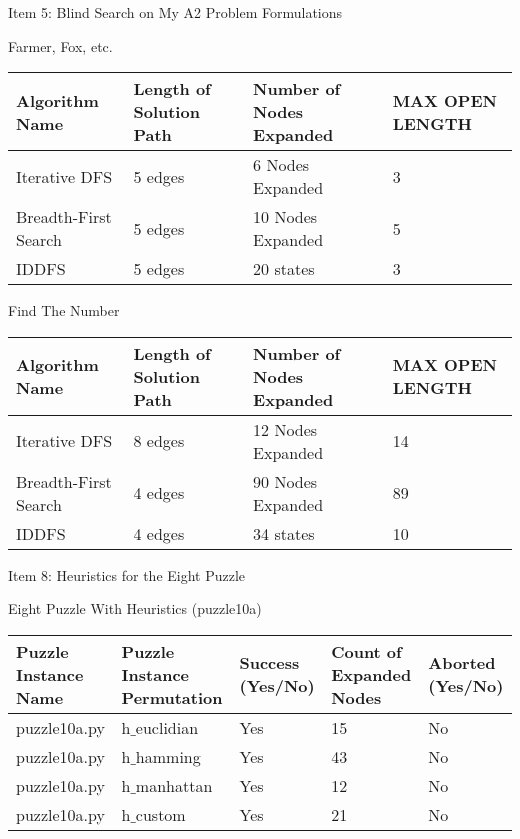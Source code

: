 \documentclass[12pt]{exam}
\begin{document}
\begin{questions}
\question Item 5: Blind Search on My A2 Problem Formulations


\begin{center}
    \tiny
    Farmer, Fox, etc.\\
    \begin{tabu} to 0.8\textwidth {  X[l] | X[l] | X[l] | X[l] }
        \hline
        Algorithm Name & Length of Solution Path & Number of Nodes Expanded & MAX OPEN LENGTH\\
        \hline
        Iterative DFS & 5 edges & 6 Nodes Expanded & 3 \\
        \hline
        Breadth-First Search & 5 edges & 10 Nodes Expanded & 5 \\
        \hline
        IDDFS & 5 edges & 20 states & 3 \\
        \hline
    \end{tabu}
\end{center}

\begin{center}
    \tiny
    Find The Number\\
    \begin{tabu} to 0.8\textwidth {  X[l] | X[l] | X[l] | X[l] }
        \hline
        Algorithm Name & Length of Solution Path & Number of Nodes Expanded & MAX OPEN LENGTH\\
        \hline
        Iterative DFS & 8 edges & 12 Nodes Expanded & 14 \\
        \hline
        Breadth-First Search & 4 edges & 90 Nodes Expanded & 89 \\
        \hline
        IDDFS & 4 edges & 34 states & 10 \\
        \hline
    \end{tabu}
\end{center}

\question Item 8: Heuristics for the Eight Puzzle

\begin{center}
    \tiny
    Eight Puzzle With Heuristics (puzzle10a)\\
    \begin{tabu} to 0.8\textwidth {  X[l] | X[l] | X[l] | X[l] | X[l]}
        \hline
        Puzzle Instance Name & Puzzle Instance Permutation & Success (Yes/No) & Count of Expanded Nodes & Aborted (Yes/No)\\
        \hline
            puzzle10a.py & h$\_$euclidian & Yes & 15 & No \\
        \hline
            puzzle10a.py & h$\_$hamming & Yes & 43 & No \\
        \hline
            puzzle10a.py & h$\_$manhattan & Yes & 12 & No \\
        \hline
            puzzle10a.py & h$\_$custom & Yes & 21 & No \\
        \hline
    \end{tabu}
\end{center}


\end{questions}
\end{document}
